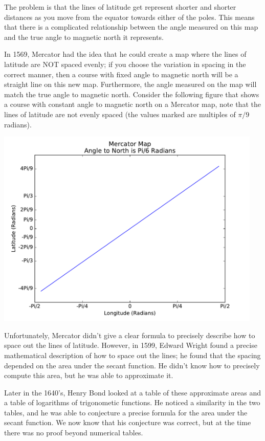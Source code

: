 The problem is that the lines of latitude get represent shorter and shorter distances as you move from the equator towards either of the poles. 
This means that there is a complicated relationship between the angle measured on this map and the true angle to magnetic north it represents.

In 1569, Mercator had the idea that he could create a map where the lines of latitude are NOT spaced evenly; if you choose the variation in spacing in the correct manner, then a course with fixed angle to magnetic north will be a straight line on this new map. 
Furthermore, the angle measured on the map will match the true angle to magnetic north.
Consider the following figure that shows a course with constant angle to magnetic north on a Mercator map, note that the lines of latitude are not evenly spaced (the values marked are multiples of \(\pi/9\) radians).

\includegraphics[width = 5in]{oneVarIntCalc/mercator.pdf}

Unfortunately, Mercator didn't give a clear formula to precisely describe how to space out the lines of latitude. 
However, in 1599, Edward Wright found a precise mathematical description of how to space out the lines; he found that the spacing depended on the area under the secant function.
He didn't know how to precisely compute this area, but he was able to approximate it. 

Later in the 1640's, Henry Bond looked at a table of these approximate areas and a table of logarithms of trigonometic functions. 
He noticed a similarity in the two tables, and he was able to conjecture a precise formula for the area under the secant function. 
We now know that his conjecture was correct, but at the time there was no proof beyond numerical tables.

